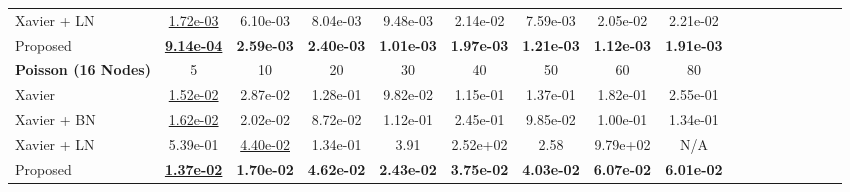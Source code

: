 \documentclass{article} \usepackage{iclr2025_conference,times}
\begin{document}
\begin{table*}[ht!]
{\begin{tabular}{l cc cc cc cc cc cc cc cc}
Xavier + LN &\underline{1.72e-03}&6.10e-03&8.04e-03&9.48e-03&2.14e-02&7.59e-03&2.05e-02&2.21e-02 \\
Proposed    &\underline{\textbf{9.14e-04}}&\textbf{2.59e-03}&\textbf{2.40e-03}&\textbf{1.01e-03}&\textbf{1.97e-03}&\textbf{1.21e-03}&\textbf{1.12e-03}&\textbf{1.91e-03} \\
\midrule
\textbf{Poisson (16 Nodes)} & 5 & 10 & 20 & 30 & 40 & 50 & 60 & 80 \\
\midrule
Xavier      &\underline{1.52e-02}&2.87e-02&1.28e-01&9.82e-02&1.15e-01&1.37e-01&
1.82e-01&2.55e-01\\
Xavier + BN &\underline{1.62e-02}&2.02e-02&8.72e-02&1.12e-01&2.45e-01&9.85e-02&
1.00e-01&1.34e-01\\
Xavier + LN &5.39e-01&\underline{4.40e-02}&1.34e-01&3.91    &2.52e+02&2.58    &
9.79e+02&N/A\\
Proposed    &\underline{\textbf{1.37e-02}}&\textbf{1.70e-02}&\textbf{4.62e-02}&\textbf{2.43e-02}&\textbf{3.75e-02}&\textbf{4.03e-02}&
\textbf{6.07e-02}&\textbf{6.01e-02}\\
\bottomrule
\end{tabular}}

\vspace{0.3cm} 


\end{table*}
\end{document}
